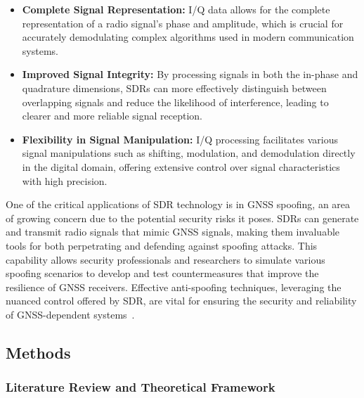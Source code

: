 \documentclass[12pt, a4paper]{extarticle}
\begin{document}
\begin{itemize}[noitemsep]
    \item \textbf{Complete Signal Representation:} I/Q data allows for the
        complete representation of a radio signal's phase and amplitude, which
        is crucial for accurately demodulating complex algorithms used in
        modern communication systems.
    \item \textbf{Improved Signal Integrity:} By processing signals in both the
        in-phase and quadrature dimensions, SDRs can more effectively
        distinguish between overlapping signals and reduce the likelihood of
        interference, leading to clearer and more reliable signal reception.
    \item \textbf{Flexibility in Signal Manipulation:} I/Q processing
        facilitates various signal manipulations such as shifting, modulation,
        and demodulation directly in the digital domain, offering extensive
        control over signal characteristics with high precision.
\end{itemize}

One of the critical applications of SDR technology is in GNSS spoofing, an area
of growing concern due to the potential security risks it poses. SDRs can
generate and transmit radio signals that mimic GNSS signals, making them
invaluable tools for both perpetrating and defending against spoofing attacks.
This capability allows security professionals and researchers to simulate
various spoofing scenarios to develop and test countermeasures that improve the
resilience of GNSS receivers. Effective anti-spoofing techniques, leveraging
the nuanced control offered by SDR, are vital for ensuring the security and
reliability of GNSS-dependent systems~\cite{hackrf1}.




\subsection{Methods}\label{sec:methods}

\subsubsection*{Literature Review and Theoretical Framework}
\end{document}

